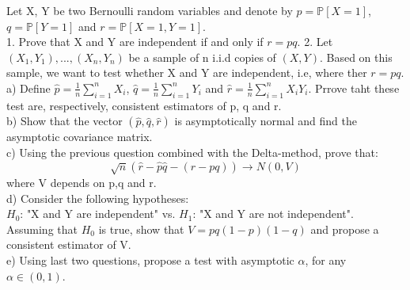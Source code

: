 \documentclass[10pt]{article}
\newenvironment{problem}[2][Problem]{\begin{trivlist}
\item[\hskip \labelsep {\bfseries #1}\hskip \labelsep {\bfseries #2.}]}{\end{trivlist}}
\begin{document}
\begin{problem}{3}
Let X, Y be two Bernoulli random variables and denote by $p=\mathbb{P}[X=1]$, $q=\mathbb{P}[Y=1]$ and $r=\mathbb{P}[X=1, Y=1]$.\\
1. Prove that X and Y are independent if and only if $r=pq$.
2. Let $(X_1, Y_1),...,(X_n, Y_n)$ be a sample of n i.i.d copies of $(X,Y)$. Based on this sample, we want to test whether X and Y are independent, i.e, where ther $r=pq$.\\
a) Define $\hat{p}=\frac{1}{n}\sum_{i=1}^{n}X_i$, $\hat{q}=\frac{1}{n}\sum_{i=1}^{n}Y_i$ and $\hat{r}=\frac{1}{n}\sum_{i=1}^{n}X_{i}Y_{i}$. Prrove taht these test are, respectively, consistent estimators of p, q and r.\\
b) Show that the vector $(\hat{p}, \hat{q}, \hat{r})$ is asymptotically normal and find the asymptotic covariance matrix.\\
c) Using the previous question combined with the Delta-method, prove that: 
\[\sqrt{n}(\hat{r}- \hat{p}\hat{q}-(r-pq)) \longrightarrow N(0, V) \]
where V depends on p,q and r.\\
d) Consider the following hypotheses:\\
$H_0$: "X and Y are independent" vs. $H_1$: "X and Y are not independent".\\
Assuming that $H_0$ is true, show that $V=pq(1-p)(1-q)$ and propose a consistent estimator of V.\\
e) Using last two questions, propose a test with asymptotic $\alpha$, for any $\alpha \in (0,1)$.


\end{problem}
\end{document}
